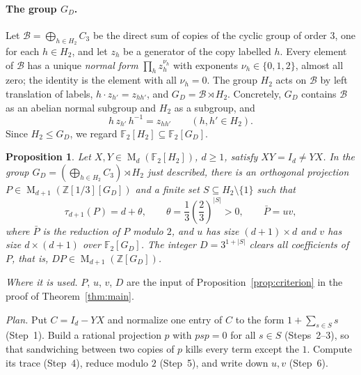 \documentclass[11pt]{article}
\newtheorem{proposition}[theorem]{Proposition}
\theoremstyle{remark}
\numberwithin{equation}{section}
\newcommand{\F}{\mathbb F}
\newcommand{\Z}{\mathbb Z}
\newcommand{\Mat}{\operatorname{M}}
\begin{document}
\paragraph{The group $G_D$.}
Let $\mathcal B=\bigoplus_{h\in H_2}C_3$ be the direct sum of copies of the cyclic group of order $3$, one for each $h\in H_2$, and let $z_h$ be a generator of the copy labelled $h$. Every element of $\mathcal B$ has a unique \emph{normal form} $\prod_hz_h^{\nu_h}$ with exponents $\nu_h\in\{0,1,2\}$, almost all zero; the identity is the element with all $\nu_h=0$. The group $H_2$ acts on $\mathcal B$ by left translation of labels, $h\cdot z_{h'}=z_{hh'}$, and $G_D=\mathcal B\rtimes H_2$. Concretely, $G_D$ contains $\mathcal B$ as an abelian normal subgroup and $H_2$ as a subgroup, and
\begin{equation}\label{eq:conj-rule}
 h\,z_{h'}\,h^{-1}=z_{hh'}\qquad(h,h'\in H_2).
\end{equation}
Since $H_2\le G_D$, we regard $\F_2[H_2]\subseteq\F_2[G_D]$.

\begin{proposition}\label{prop:separation}
Let $X,Y\in\Mat_d(\F_2[H_2])$, $d\ge1$, satisfy
$XY=I_d\ne YX$. In the group
$G_D=(\bigoplus_{h\in H_2}C_3)\rtimes H_2$ just described, there is an orthogonal
projection $P\in\Mat_{d+1}(\Z[1/3][G_D])$ and a finite set
$S\subseteq H_2\setminus\{1\}$ such that
\[
 \tau_{d+1}(P)=d+\theta,\qquad
 \theta=\frac13\left(\frac23\right)^{|S|}>0,
 \qquad \bar P=uv,
\]
where $\bar P$ is the reduction of $P$ modulo $2$, and $u$ has size $(d+1)\times d$ and $v$ has size $d\times(d+1)$
over $\F_2[G_D]$. The integer $D=3^{1+|S|}$ clears all coefficients
of $P$, that is, $DP\in\Mat_{d+1}(\Z[G_D])$.
\end{proposition}

\noindent\emph{Where it is used.} $P$, $u$, $v$, $D$ are the input of Proposition~\ref{prop:criterion} in the proof of Theorem~\ref{thm:main}.

\noindent\emph{Plan.} Put $C=I_d-YX$ and normalize one entry of $C$ to the form $1+\sum_{s\in S}s$ (Step~1). Build a rational projection $p$ with $psp=0$ for all $s\in S$ (Steps~2--3), so that sandwiching between two copies of $p$ kills every term except the $1$. Compute its trace (Step~4), reduce modulo $2$ (Step~5), and write down $u,v$ (Step~6).
\end{document}
